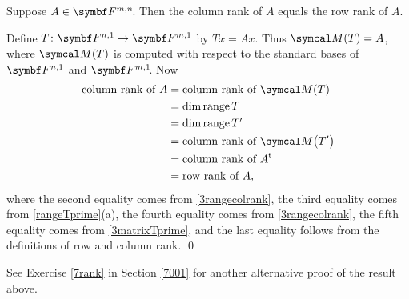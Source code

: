 {Suppose $A \in \FF{m, n}$. Then the column rank of $A$ equals the row rank of $A$.}

\proof
Define $T \colon \F{n,1} \to \F{m,1}$ by $Tx = Ax$. Thus $\M(T) = A$, where $\M(T)$ is computed with respect to the standard bases of $\F{n,1}$ and $\FF{m,1}$. Now
\begin{align*}
\text{column rank of}\ A &= \text{column rank of}\ \M(T)\\
&= \dim \ran T \\
&= \dim \ran T' \\
&= \text{column rank of}\ \M\paren[\big]{T'} \\
&= \text{column rank of}\ \tran{A} \\
&= \text{row rank of}\ A,
\end{align*}
where the second equality comes from \ref{3rangecolrank}, the third equality comes from \ref{rangeTprime}(a), the fourth equality comes from \ref{3rangecolrank}, the fifth equality comes from \ref{3matrixTprime}, and the last equality follows from the definitions of row and column rank.
\qed

See Exercise \ref{7rank} in Section \ref{7001} for another alternative proof of the result above.

\pagebreak[3]

